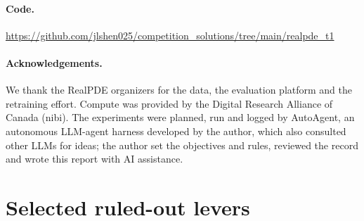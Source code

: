\documentclass[10pt]{article}
\begin{document}
\paragraph{Code.} \url{https://github.com/jlshen025/competition_solutions/tree/main/realpde_t1}

\paragraph{Acknowledgements.} We thank the RealPDE organizers for the data, the evaluation platform and the retraining effort. Compute was provided by the Digital Research Alliance of Canada (nibi). The experiments were planned, run and logged by AutoAgent, an autonomous LLM-agent harness developed by the author, which also consulted other LLMs for ideas; the author set the objectives and rules, reviewed the record and wrote this report with AI assistance.




\appendix

\section{Selected ruled-out levers}
\label{app:levers}
\end{document}
